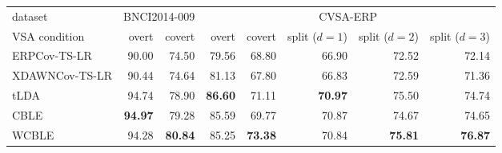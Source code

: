 \sffamily
\small
\begin{tabularx}{\linewidth}{@{}Xrrrrrrr@{}}
\toprule
dataset & \multicolumn{2}{c}{BNCI2014-009} & \multicolumn{5}{c}{CVSA-ERP} \\
\cmidrule(lr){2-3} \cmidrule(lr){4-8}
  VSA condition & overt & covert & overt & covert & \makecell[r]{split \\  ($d=1$)}  & \makecell[r]{split \\ ($d=2$)} & \makecell[r]{split \\ ($d=3$)} \\
\midrule
ERPCov-TS-LR    & 90.00     & 74.50        & 79.56     & 68.80      & 66.90  & 72.52      & 72.14 \\
  {\footnotesize XDAWNCov-TS-LR}  & 90.44     & 74.64        & 81.13     & 67.80      & 66.83  & 72.59      & 71.36 \\
  tLDA            & 94.74     & 78.90        & \textbf{86.60} & 71.11      &   \textbf{70.97}      & 75.50      & 74.74 \\
  CBLE            & \textbf{94.97} & 79.28        & 85.59     & 69.77      & 70.87  &  74.67      & 74.65 \\
  WCBLE           & 94.28     & \textbf{80.84}    & 85.25     & \textbf{73.38}
  & 70.84  &  \textbf{75.81}  & \textbf{76.87} \\
\bottomrule
\end{tabularx}
